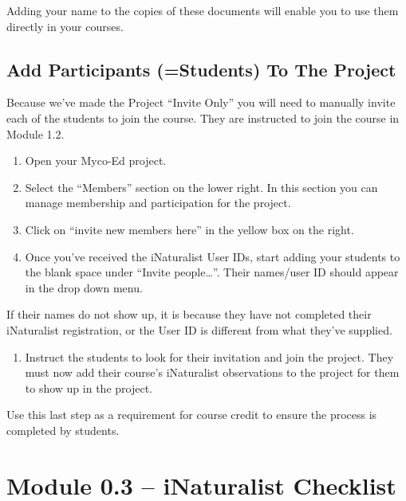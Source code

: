 \documentclass[
  letterpaper,
  DIV=11,
  numbers=noendperiod]{scrreprt}
\providecommand{\tightlist}{%
  \setlength{\itemsep}{0pt}\setlength{\parskip}{0pt}}
\begin{document}
Adding your name to the copies of these documents will enable you to use
them directly in your courses.

\subsection*{Add Participants (=Students) To The
Project}\label{add-participants-students-to-the-project}

Because we've made the Project ``Invite Only'' you will need to manually
invite each of the students to join the course. They are instructed to
join the course in Module 1.2.

\begin{enumerate}
\def\labelenumi{\arabic{enumi}.}
\tightlist
\item
  Open your Myco-Ed project.
\item
  Select the ``Members'' section on the lower right. In this section you
  can manage membership and participation for the project.
\item
  Click on ``invite new members here'' in the yellow box on the right.
\item
  Once you've received the iNaturalist User IDs, start adding your
  students to the blank space under ``Invite people\ldots{}''. Their
  names/user ID should appear in the drop down menu.
\end{enumerate}

If their names do not show up, it is because they have not completed
their iNaturalist registration, or the User ID is different from what
they've supplied.

\begin{enumerate}
\def\labelenumi{\arabic{enumi}.}
\setcounter{enumi}{4}
\tightlist
\item
  Instruct the students to look for their invitation and join the
  project. They must now add their course's iNaturalist observations to
  the project for them to show up in the project.
\end{enumerate}

Use this last step as a requirement for course credit to ensure the
process is completed by students.

\section*{Module 0.3 -- iNaturalist
Checklist}\label{module-0.3-inaturalist-checklist}
\end{document}
